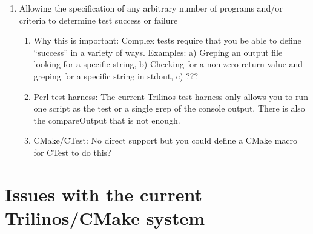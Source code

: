 \documentclass[pdf,ps2pdf,11pt]{SANDreport}
\begin{document}
\begin{enumerate}
\begin{enumerate}
\begin{enumerate}
    \end{enumerate}

  {}\item Allowing the specification of any arbitrary number of
  programs and/or criteria to determine test success or failure

    \begin{enumerate}

    {}\item Why this is important: Complex tests require that you be
    able to define ``success'' in a variety of ways.  Examples: a)
    Greping an output file looking for a specific string, b) Checking
    for a non-zero return value and greping for a specific string in
    stdout, c) ???

    {}\item Perl test harness: The current Trilinos test harness only
    allows you to run one script as the test or a single grep of the
    console output.  There is also the compareOutput that is not
    enough.

    {}\item CMake/CTest: No direct support but you could define a
    CMake macro for CTest to do this?

    \end{enumerate}

  \end{enumerate}

\end{enumerate}



%
\section{Issues with the current Trilinos/CMake system}
%
\end{document}
